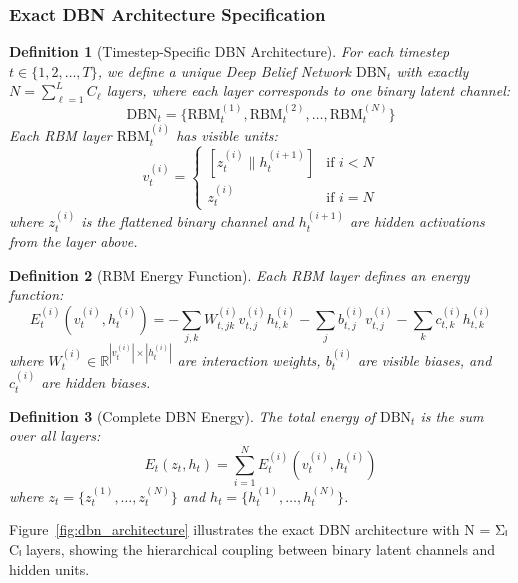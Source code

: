 \documentclass{article}
\newtheorem{definition}{Definition}
\begin{document}
\subsubsection{Exact DBN Architecture Specification}

\begin{definition}[Timestep-Specific DBN Architecture]
For each timestep $t \in \{1, 2, \ldots, T\}$, we define a unique Deep Belief Network $\text{DBN}_t$ with exactly $N = \sum_{\ell=1}^L C_\ell$ layers, where each layer corresponds to one binary latent channel:
\begin{equation}
\text{DBN}_t = \{\text{RBM}_t^{(1)}, \text{RBM}_t^{(2)}, \ldots, \text{RBM}_t^{(N)}\}
\end{equation}
Each RBM layer $\text{RBM}_t^{(i)}$ has visible units:
\begin{equation}
v_t^{(i)} = \begin{cases}
[z_t^{(i)} \| h_t^{(i+1)}] & \text{if } i < N \\
z_t^{(i)} & \text{if } i = N
\end{cases}
\end{equation}
where $z_t^{(i)}$ is the flattened binary channel and $h_t^{(i+1)}$ are hidden activations from the layer above.
\end{definition}

\begin{definition}[RBM Energy Function]
Each RBM layer defines an energy function:
\begin{equation}
E_t^{(i)}(v_t^{(i)}, h_t^{(i)}) = -\sum_{j,k} W_{t,jk}^{(i)} v_{t,j}^{(i)} h_{t,k}^{(i)} - \sum_j b_{t,j}^{(i)} v_{t,j}^{(i)} - \sum_k c_{t,k}^{(i)} h_{t,k}^{(i)}
\end{equation}
where $W_t^{(i)} \in \mathbb{R}^{|v_t^{(i)}| \times |h_t^{(i)}|}$ are interaction weights, $b_t^{(i)}$ are visible biases, and $c_t^{(i)}$ are hidden biases.
\end{definition}

\begin{definition}[Complete DBN Energy]
The total energy of $\text{DBN}_t$ is the sum over all layers:
\begin{equation}
E_t(z_t, h_t) = \sum_{i=1}^N E_t^{(i)}(v_t^{(i)}, h_t^{(i)})
\end{equation}
where $z_t = \{z_t^{(1)}, \ldots, z_t^{(N)}\}$ and $h_t = \{h_t^{(1)}, \ldots, h_t^{(N)}\}$.
\end{definition}

Figure~\ref{fig:dbn_architecture} illustrates the exact DBN architecture with N = Σₗ Cₗ layers, showing the hierarchical coupling between binary latent channels and hidden units.
\end{document}
